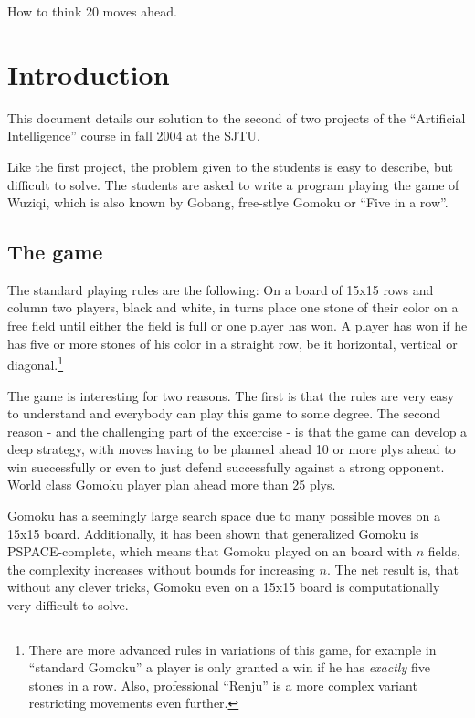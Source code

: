 \documentclass[10pt]{article}
\begin{document}
\begin{center}
How to think 20 moves ahead.
\end{center}

\section{Introduction}

This document details our solution to the second of two projects of the
``Artificial Intelligence'' course in fall 2004 at the SJTU.

Like the first project, the problem given to the students is easy to describe,
but difficult to solve.  The students are asked to write a program playing the
game of Wuziqi, which is also known by Gobang, free-stlye Gomoku or ``Five in
a row''.

\subsection{The game}

The standard playing rules are the following: On a board of 15x15 rows and
column two players, black and white, in turns place one stone of their color
on a free field until either the field is full or one player has won.  A
player has won if he has five or more stones of his color in a
straight row, be it horizontal, vertical or diagonal.\footnote{There are more
advanced rules in variations of this game, for example in ``standard Gomoku''
a player is only granted a win if he has {\em exactly} five stones in a row.
Also, professional ``Renju'' is a more complex variant restricting movements
even further.}

The game is interesting for two reasons.  The first is that the rules are
very easy to understand and everybody can play this game to some degree.  The
second reason - and the challenging part of the excercise - is that the game
can develop a deep strategy, with moves having to be planned ahead 10 or more
plys ahead to win successfully or even to just defend successfully against a
strong opponent.  World class Gomoku player plan ahead more than 25 plys.

Gomoku has a seemingly large search space due to many possible moves on a
15x15 board.  Additionally, it has been shown that generalized Gomoku is
PSPACE-complete, which means that Gomoku played on an board with $n$ fields,
the complexity increases without bounds for increasing $n$.  The net result
is, that without any clever tricks, Gomoku even on a 15x15 board is
computationally very difficult to solve.
\end{document}
